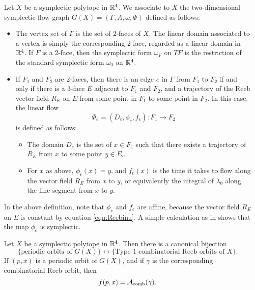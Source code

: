 \begin{definition}
\label{def:sfgp}
Let $X$ be a symplectic polytope in ${\mathbb R}^4$. We associate to $X$ the two-dimensional symplectic flow graph $G(X)=(\Gamma,A,\omega,\Phi)$ defined as follows:
\begin{itemize}
    \item The vertex set of $\Gamma$ is the set of $2$-faces of $X$. The linear domain associated to a vertex is simply the corresponding $2$-face, regarded as a linear domain in ${\mathbb R}^4$. If $F$ is a $2$-face, then the symplectic form $\omega_F$ on $TF$ is the restriction of the standard symplectic form $\omega_0$ on ${\mathbb R}^4$.
    \item If $F_1$ and $F_2$ are $2$-faces, then there is an edge $e$ in $\Gamma$ from $F_1$ to $F_2$ if and only if there is a $3$-face $E$ adjacent to $F_1$ and $F_2$, and a trajectory of the Reeb vector field $R_E$ on $E$ from some point in $F_1$ to some point in $F_2$. In this case, the linear flow
    \[
\Phi_e = (D_e,\phi_e,f_e):F_1\longrightarrow F_2
    \]
    is defined as follows:
\begin{itemize}
  \item
  The domain $D_e$ is the set of $x\in F_1$ such that there exists a trajectory of $R_E$ from $x$ to some point $y\in F_2$.
  \item
  For $x$ as above, $\phi_e(x)=y$, and $f_e(x)$ is the time it takes to flow along the vector field $R_E$ from $x$ to $y$, or equivalently the integral of $\lambda_0$ along the line segment from $x$ to $y$.
 \end{itemize}
\end{itemize} 
\end{definition}

In the above definition, note that $\phi_e$ and $f_e$ are affine, because the vector field $R_E$ on $E$ is constant by equation \eqref{eqn:Reebinu}.  A simple calculation as in \cite[Eq.\ (5.10)]{hwz} shows that the map $\phi_e$ is symplectic.

\begin{proposition}
\label{prop:orbitbijection}
Let $X$ be a symplectic polytope in ${\mathbb R}^4$. Then there is a canonical bijection
\[
\{\mbox{periodic orbits of $G(X)$}\} \longleftrightarrow \{\mbox{Type $1$ combinatorial Reeb orbits of $X$}\}.
\]
If $(p,x)$ is a periodic orbit of $G(X)$, and if $\gamma$ is the corresponding combinatorial Reeb orbit, then
\begin{equation}
\label{eqn:identifyactions}
f(p,x) = {\mathcal A}_{\operatorname{comb}}(\gamma).
\end{equation}
\end{proposition}

